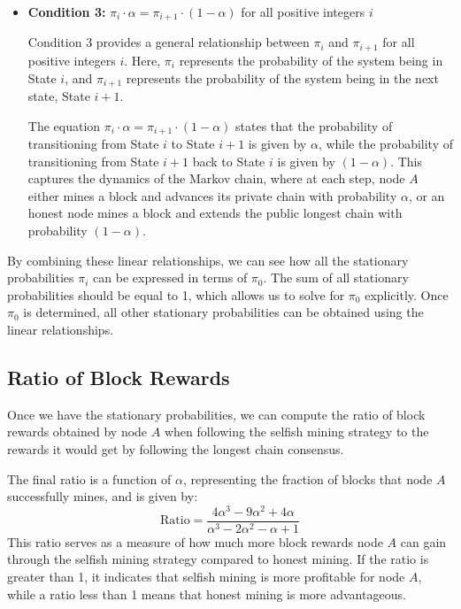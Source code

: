 \begin{itemize}
    \item \textbf{Condition 3:} $\pi_i \cdot \alpha = \pi_{i+1} \cdot (1 - \alpha)$ for all positive integers $i$

    Condition 3 provides a general relationship between $\pi_i$ and $\pi_{i+1}$ for all positive integers $i$. Here, $\pi_i$ represents the probability of the system being in State $i$, and $\pi_{i+1}$ represents the probability of the system being in the next state, State $i+1$.
    
    The equation $\pi_i \cdot \alpha = \pi_{i+1} \cdot (1 - \alpha)$ states that the probability of transitioning from State $i$ to State $i+1$ is given by $\alpha$, while the probability of transitioning from State $i+1$ back to State $i$ is given by $(1 - \alpha)$. This captures the dynamics of the Markov chain, where at each step, node $A$ either mines a block and advances its private chain with probability $\alpha$, or an honest node mines a block and extends the public longest chain with probability $(1 - \alpha)$.

\end{itemize}
By combining these linear relationships, we can see how all the stationary probabilities $\pi_i$ can be expressed in terms of $\pi_0$. The sum of all stationary probabilities should be equal to 1, which allows us to solve for $\pi_0$ explicitly. Once $\pi_0$ is determined, all other stationary probabilities can be obtained using the linear relationships.               

\subsection{Ratio of Block Rewards}
Once we have the stationary probabilities, we can compute the ratio of block rewards obtained by node $A$ when following the selfish mining strategy to the rewards it would get by following the longest chain consensus.

The final ratio is a function of $\alpha$, representing the fraction of blocks that node $A$ successfully mines, and is given by:
$$ \text{Ratio} = \frac{4\alpha^3 - 9\alpha^2 + 4\alpha}{\alpha^3 - 2\alpha^2 - \alpha + 1} $$
This ratio serves as a measure of how much more block rewards node $A$ can gain through the selfish mining strategy compared to honest mining. If the ratio is greater than 1, it indicates that selfish mining is more profitable for node $A$, while a ratio less than 1 means that honest mining is more advantageous.\\

